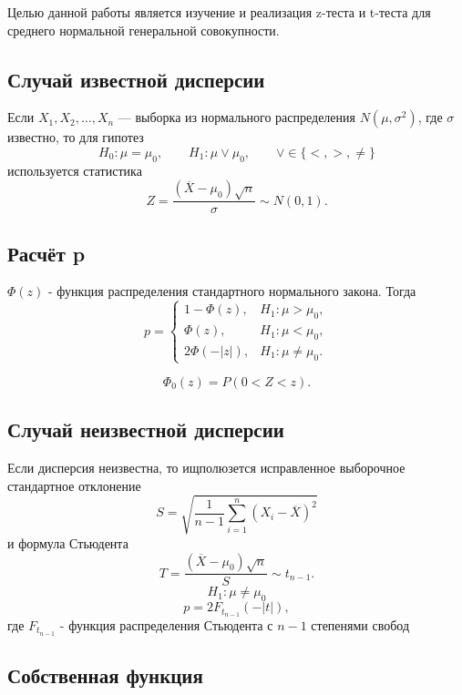 \documentclass[a4paper,14pt]{extarticle}
\begin{document}
Целью данной работы является изучение и реализация z-теста и t-теста для среднего нормальной генеральной совокупности.

\subsection{Случай известной дисперсии}

Если \(X_1, X_2, \dots, X_n\) --- выборка из нормального распределения \(N(\mu,\sigma^2)\), где \(\sigma\) известно, то для гипотез
\[
H_0:\mu=\mu_0,
\qquad
H_1:\mu \vee \mu_0,
\qquad
\vee \in \{<,>,\neq\}
\]
используется статистика
\[
Z=\frac{(\overline{X}-\mu_0)\sqrt{n}}{\sigma}\sim N(0,1).
\]

\subsection{Расчёт p}

 \(\Phi(z)\) - функция распределения стандартного нормального закона. Тогда
\[
p=
\begin{cases}
1-\Phi(z), & H_1:\mu>\mu_0,\\
\Phi(z), & H_1:\mu<\mu_0,\\
2\Phi(-|z|), & H_1:\mu\neq\mu_0.
\end{cases}
\]

\[
\Phi_0(z)=P(0<Z<z).
\]




\subsection{Случай неизвестной дисперсии}

Если дисперсия неизвестна, то ищполюзется исправленное выборочное стандартное отклонение
\[
S=\sqrt{\frac{1}{n-1}\sum_{i=1}^{n}(X_i-\overline{X})^2}
\]
и формула Стьюдента
\[
T=\frac{(\overline{X}-\mu_0)\sqrt{n}}{S}\sim t_{n-1}.
\]
 \[H_1:\mu\neq\mu_0\]
\[
p=2F_{t_{n-1}}(-|t|),
\]
где \(F_{t_{n-1}}\) - функция распределения  Стьюдента с \(n-1\) степенями свобод

\subsection{Собственная функция}
\end{document}

